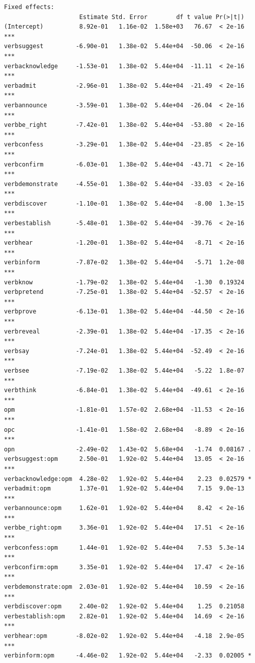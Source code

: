 \documentclass[10pt]{article}\usepackage[]{graphicx}\usepackage[]{color}
\makeatletter
\newenvironment{kframe}{%
 \def\at@end@of@kframe{}%
 \ifinner\ifhmode%
  \def\at@end@of@kframe{\end{minipage}}%
  \begin{minipage}{\columnwidth}%
 \fi\fi%
 \def\FrameCommand##1{\hskip\@totalleftmargin \hskip-\fboxsep
 \colorbox{shadecolor}{##1}\hskip-\fboxsep
     \hskip-\linewidth \hskip-\@totalleftmargin \hskip\columnwidth}%
 \MakeFramed {\advance\hsize-\width
   \@totalleftmargin\z@ \linewidth\hsize
   \@setminipage}}%
 {\par\unskip\endMakeFramed%
 \at@end@of@kframe}
\newenvironment{knitrout}{}{} %
\makeatother
\begin{document}
\begin{knitrout}
\begin{kframe}
\begin{verbatim}
Fixed effects:
                     Estimate Std. Error        df t value Pr(>|t|)    
(Intercept)          8.92e-01   1.16e-02  1.58e+03   76.67  < 2e-16 ***
verbsuggest         -6.90e-01   1.38e-02  5.44e+04  -50.06  < 2e-16 ***
verbacknowledge     -1.53e-01   1.38e-02  5.44e+04  -11.11  < 2e-16 ***
verbadmit           -2.96e-01   1.38e-02  5.44e+04  -21.49  < 2e-16 ***
verbannounce        -3.59e-01   1.38e-02  5.44e+04  -26.04  < 2e-16 ***
verbbe_right        -7.42e-01   1.38e-02  5.44e+04  -53.80  < 2e-16 ***
verbconfess         -3.29e-01   1.38e-02  5.44e+04  -23.85  < 2e-16 ***
verbconfirm         -6.03e-01   1.38e-02  5.44e+04  -43.71  < 2e-16 ***
verbdemonstrate     -4.55e-01   1.38e-02  5.44e+04  -33.03  < 2e-16 ***
verbdiscover        -1.10e-01   1.38e-02  5.44e+04   -8.00  1.3e-15 ***
verbestablish       -5.48e-01   1.38e-02  5.44e+04  -39.76  < 2e-16 ***
verbhear            -1.20e-01   1.38e-02  5.44e+04   -8.71  < 2e-16 ***
verbinform          -7.87e-02   1.38e-02  5.44e+04   -5.71  1.2e-08 ***
verbknow            -1.79e-02   1.38e-02  5.44e+04   -1.30  0.19324    
verbpretend         -7.25e-01   1.38e-02  5.44e+04  -52.57  < 2e-16 ***
verbprove           -6.13e-01   1.38e-02  5.44e+04  -44.50  < 2e-16 ***
verbreveal          -2.39e-01   1.38e-02  5.44e+04  -17.35  < 2e-16 ***
verbsay             -7.24e-01   1.38e-02  5.44e+04  -52.49  < 2e-16 ***
verbsee             -7.19e-02   1.38e-02  5.44e+04   -5.22  1.8e-07 ***
verbthink           -6.84e-01   1.38e-02  5.44e+04  -49.61  < 2e-16 ***
opm                 -1.81e-01   1.57e-02  2.68e+04  -11.53  < 2e-16 ***
opc                 -1.41e-01   1.58e-02  2.68e+04   -8.89  < 2e-16 ***
opn                 -2.49e-02   1.43e-02  5.68e+04   -1.74  0.08167 .  
verbsuggest:opm      2.50e-01   1.92e-02  5.44e+04   13.05  < 2e-16 ***
verbacknowledge:opm  4.28e-02   1.92e-02  5.44e+04    2.23  0.02579 *  
verbadmit:opm        1.37e-01   1.92e-02  5.44e+04    7.15  9.0e-13 ***
verbannounce:opm     1.62e-01   1.92e-02  5.44e+04    8.42  < 2e-16 ***
verbbe_right:opm     3.36e-01   1.92e-02  5.44e+04   17.51  < 2e-16 ***
verbconfess:opm      1.44e-01   1.92e-02  5.44e+04    7.53  5.3e-14 ***
verbconfirm:opm      3.35e-01   1.92e-02  5.44e+04   17.47  < 2e-16 ***
verbdemonstrate:opm  2.03e-01   1.92e-02  5.44e+04   10.59  < 2e-16 ***
verbdiscover:opm     2.40e-02   1.92e-02  5.44e+04    1.25  0.21058    
verbestablish:opm    2.82e-01   1.92e-02  5.44e+04   14.69  < 2e-16 ***
verbhear:opm        -8.02e-02   1.92e-02  5.44e+04   -4.18  2.9e-05 ***
verbinform:opm      -4.46e-02   1.92e-02  5.44e+04   -2.33  0.02005 *  

\end{verbatim}
\end{kframe}
\end{knitrout}
\end{document}
